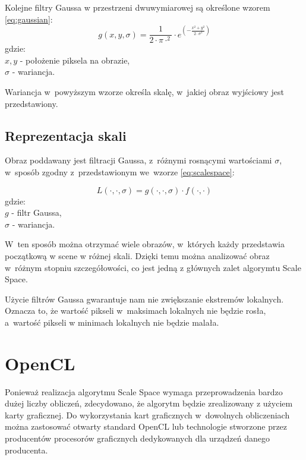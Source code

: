 Kolejne filtry Gaussa w przestrzeni dwuwymiarowej są określone wzorem \ref{eq:gaussian}:
\begin{equation}
\label{eq:gaussian}
g(x,y,\sigma)=\frac{1}{2 \cdot \pi \cdot ^ {2} }\cdot e^{(-\frac{x^{2} + y^{2}}{2 \cdot \sigma ^{2}})}
\end{equation}
gdzie:\\
$ x,y $ - położenie piksela na obrazie, \\
$ \sigma $ - wariancja.

Wariancja w~powyższym wzorze określa skalę, w~jakiej obraz wyjściowy jest przedstawiony. 

\subsection{Reprezentacja skali}
\label{subsec:reprezentacjaskali}
Obraz poddawany jest filtracji Gaussa, z~różnymi rosnącymi wartościami $ \sigma $, w~sposób zgodny z~przedstawionym we~wzorze \ref{eq:scalespace}:

\begin{equation}
\label{eq:scalespace}
L(\cdot,\cdot,\sigma) = g(\cdot,\cdot,\sigma)\cdot f(\cdot,\cdot)
\end{equation}
gdzie:\\
$ g $ - filtr Gaussa, \\
$ \sigma $ - wariancja.

W~ten sposób można otrzymać wiele obrazów, w~których każdy przedstawia początkową w scene w różnej skali. Dzięki temu można analizować obraz w~różnym stopniu szczegółowości, co jest jedną z głównych zalet algorymtu Scale Space.

Użycie filtrów Gaussa gwarantuje nam nie zwiększanie ekstremów lokalnych. Oznacza to, że wartość pikseli w~maksimach lokalnych nie będzie rosła, a~wartość pikseli w minimach lokalnych nie będzie malała.


\section{OpenCL}
\label{sec:OpenCL}

Ponieważ realizacja algorytmu Scale Space wymaga przeprowadzenia bardzo dużej liczby obliczeń, zdecydowano, że algorytm będzie zrealizowany z użyciem karty graficznej. Do wykorzystania kart graficznych w~dowolnych obliczeniach można zastosować otwarty standard OpenCL lub technologie stworzone przez producentów procesorów graficznych dedykowanych dla urządzeń danego producenta.

